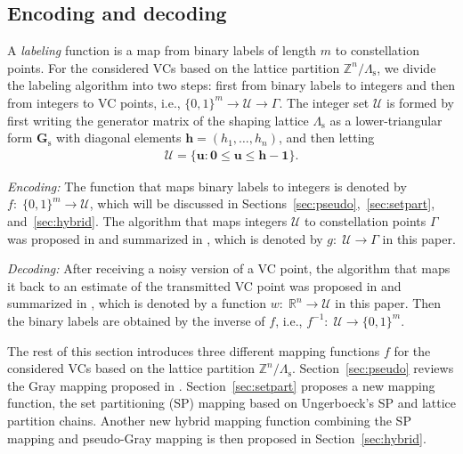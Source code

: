 \documentclass[journal]{IEEEtran}
\newcommand{\R}{\mathbb{R}}
\newcommand{\Z}{\mathbb{Z}}
\newcommand{\U}{\mathcal{U}}
\newcommand{\bh}{\boldsymbol{h}}
\newcommand{\bu}{\boldsymbol{u}}
\newcommand{\bGs}{\boldsymbol{G}_\mathrm{s}}
\newcommand{\bzero}{\boldsymbol{0}}
\newcommand{\bone}{\boldsymbol{1}}
\newcommand{\Lambdas}{\Lambda_\mathrm{s}}
\begin{document}
\subsection{Encoding and decoding}\label{sec:encdec}
A \emph{labeling} function is a map from binary labels of length $m$ to constellation points. For the considered VCs based on the lattice partition $\Z^n/\Lambdas$, we divide the labeling algorithm into two steps: first from binary labels to integers and then from integers to VC points, i.e.,
$\{0,1\}^m \rightarrow \U \rightarrow \Gamma$. The integer set $\U$ is formed by first writing the generator matrix of the shaping lattice $\Lambdas$ as a lower-triangular form $\bGs$ with diagonal elements $\bh=(h_1,\dots,h_n)$, and then letting 
\begin{align}
    \U =\{\bu:\bzero\leq \bu\leq \bh-\bone\}.
\end{align}

\emph{Encoding:}
The function that maps binary labels to integers is denoted by $f: \; \{0,1\}^m \rightarrow \U$, which will be discussed in Sections~\ref{sec:pseudo},~\ref{sec:setpart}, and~\ref{sec:hybrid}. The algorithm that maps integers $\U$ to constellation points $\Gamma$ was proposed in \cite{kurkoski18} and summarized in \cite[Alg.~1]{ourTC}, which is denoted by ${g: \; \U \rightarrow \Gamma}$ in this paper.

\emph{Decoding:} After receiving a noisy version of a VC point, the algorithm that maps it back to an estimate of the transmitted VC point was proposed in \cite{kurkoski18} and summarized in \cite[Alg.~2]{ourTC}, which is denoted by a function ${w: \; \R^n \rightarrow \U}$ in this paper. Then the binary labels are obtained by the inverse of $f$, i.e., $f^{-1}: \; \U \rightarrow \{0,1\}^m$.


The rest of this section introduces three different mapping functions $f$ for the considered VCs based on the lattice partition $\Z^n/\Lambdas$. Section~\ref{sec:pseudo} reviews the Gray mapping proposed in 
 \cite{ourISIT}. Section~\ref{sec:setpart} proposes a new mapping function, the set partitioning (SP) mapping based on Ungerboeck's SP and lattice partition chains. Another new hybrid mapping function combining the SP mapping and pseudo-Gray mapping is then proposed in Section~\ref{sec:hybrid}.
\end{document}
